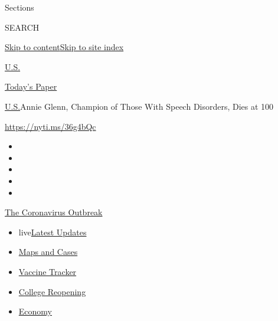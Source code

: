 Sections

SEARCH

\protect\hyperlink{site-content}{Skip to
content}\protect\hyperlink{site-index}{Skip to site index}

\href{https://www.nytimes3xbfgragh.onion/section/us}{U.S.}

\href{https://myaccount.nytimes3xbfgragh.onion/auth/login?response_type=cookie\&client_id=vi}{}

\href{https://www.nytimes3xbfgragh.onion/section/todayspaper}{Today's
Paper}

\href{/section/us}{U.S.}\textbar{}Annie Glenn, Champion of Those With
Speech Disorders, Dies at 100

\url{https://nyti.ms/36g4bQc}

\begin{itemize}
\item
\item
\item
\item
\item
\end{itemize}

\href{https://www.nytimes3xbfgragh.onion/news-event/coronavirus?action=click\&pgtype=Article\&state=default\&region=TOP_BANNER\&context=storylines_menu}{The
Coronavirus Outbreak}

\begin{itemize}
\tightlist
\item
  live\href{https://www.nytimes3xbfgragh.onion/2020/08/04/world/coronavirus-covid-19.html?action=click\&pgtype=Article\&state=default\&region=TOP_BANNER\&context=storylines_menu}{Latest
  Updates}
\item
  \href{https://www.nytimes3xbfgragh.onion/interactive/2020/us/coronavirus-us-cases.html?action=click\&pgtype=Article\&state=default\&region=TOP_BANNER\&context=storylines_menu}{Maps
  and Cases}
\item
  \href{https://www.nytimes3xbfgragh.onion/interactive/2020/science/coronavirus-vaccine-tracker.html?action=click\&pgtype=Article\&state=default\&region=TOP_BANNER\&context=storylines_menu}{Vaccine
  Tracker}
\item
  \href{https://www.nytimes3xbfgragh.onion/2020/08/02/us/covid-college-reopening.html?action=click\&pgtype=Article\&state=default\&region=TOP_BANNER\&context=storylines_menu}{College
  Reopening}
\item
  \href{https://www.nytimes3xbfgragh.onion/live/2020/08/03/business/stock-market-today-coronavirus?action=click\&pgtype=Article\&state=default\&region=TOP_BANNER\&context=storylines_menu}{Economy}
\end{itemize}

